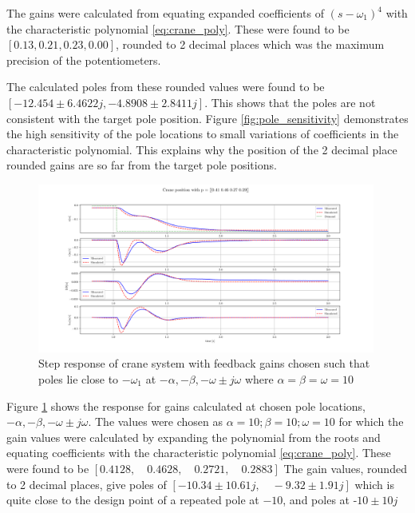 \documentclass{article}
\begin{document}
The gains were calculated from equating expanded coefficients of $(s - \omega_1)^4$ with the characteristic polynomial \ref{eq:crane_poly}.
These were found to be $[ 0.13,  0.21,  0.23, 0.00 ]$, rounded to 2 decimal places which was the maximum precision of the potentiometers.

The calculated poles from these rounded values were found to be $[-12.454 \pm 6.4622j, -4.8908 \pm 2.8411j]$.
This shows that the poles are not consistent with the target pole position.
Figure \ref{fig:pole_sensitivity} demonstrates the high sensitivity of the pole locations to small variations of coefficients in the characteristic polynomial.
This explains why the position of the 2 decimal place rounded gains are so far from the target pole positions.

\begin{figure}[H]
  \centering
  \includegraphics[width=0.99\textwidth]{figures/3.4b.png}
  \caption{Step response of crane system with feedback gains chosen such that poles lie close to $-\omega_1$ at $-\alpha, -\beta, -\omega \pm j\omega$ where $\alpha = \beta = \omega = 10$}
  \label{fig:exp3.4b}
\end{figure}

Figure \ref{fig:exp3.4b} shows the response for gains calculated at chosen pole locations, $-\alpha, -\beta, -\omega \pm j\omega$.
The values were chosen as $\alpha = 10; \beta= 10; \omega = 10$ for which the gain values were calculated by expanding the polynomial from the roots and equating
coefficients with the characteristic polynomial \ref{eq:crane_poly}.
These were found to be $[0.4128, \quad 0.4628, \quad 0.2721, \quad 0.2883]$
The gain values, rounded to 2 decimal places, give poles of $[-10.34 \pm 10.61j, \quad -9.32 \pm 1.91j]$ 
which is quite close to the design point of a repeated pole at $-10$, and poles at -$10\pm 10j$
\end{document}
